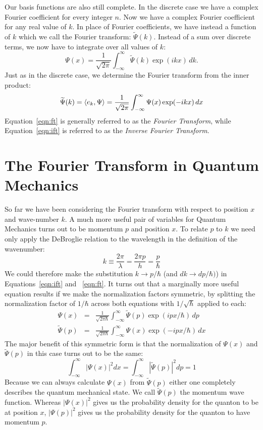 \documentclass[12pt]{book}
\begin{document}
Our basis functions are also still complete.  In the discrete case we have a complex Fourier coefficient for every integer $n$.   Now we have a complex Fourier coefficient for any real value of $k$.  In place of Fourier coefficients, we have instead a function of $k$ which we call the Fourier transform: $\widetilde{\Psi}(k)$.
Instead of a sum over discrete terms, we now have to integrate over all values of $k$:
\begin{equation} \label{eqn:ift}
\Psi(x) = \frac{1}{\sqrt{2\pi}} \int_{-\infty}^{\infty} \widetilde{\Psi}(k) \exp(ikx) \, dk.
\end{equation}
Just as in the discrete case, we determine the Fourier transform from the inner product:
\begin{equation} \label{eqn:ft}
\widetilde{\Psi}(k) = \braket{e_k, \Psi} = \frac{1}{\sqrt{2\pi}} \int_{-\infty}^{\infty} {\Psi}(x) \exp(-ikx) \, dx
\end{equation}
Equation~\ref{eqn:ft} is generally referred to as the {\em Fourier Transform}, while Equation~\ref{eqn:ift} is referred to as the {\em Inverse Fourier Transform}.

\section{The Fourier Transform in Quantum Mechanics}

So far we have been considering the Fourier transform with respect to position $x$ and wave-number $k$.  A much more useful pair of variables for Quantum Mechanics turns out to be momentum $p$ and position $x$.  To relate $p$ to $k$ we need only apply the DeBroglie relation to the wavelength in the definition of the wavenumber:
\begin{displaymath}
k \equiv \frac{2 \pi}{\lambda} = \frac{2 \pi p}{h} = \frac{p}{\hbar}
\end{displaymath}
We could therefore make the substitution $k \to p/\hbar$ (and $dk \to dp / \hbar)$) in Equations~\ref{eqn:ift} and ~\ref{eqn:ft}.  It turns out that a marginally more useful equation results if we make the normalization factors symmetric, by splitting the normalization factor of $1/\hbar$ across both equations with $1/\sqrt{\hbar}$ applied to each:
\begin{eqnarray} 
\Psi(x) &=& \frac{1}{\sqrt{2\pi\hbar}} \int_{-\infty}^{\infty} \widetilde{\Psi}(p) \exp(ipx/\hbar) \, dp \\
\widetilde{\Psi}(p) &=&  \frac{1}{\sqrt{2\pi\hbar}} \int_{-\infty}^{\infty} {\Psi}(x) \exp(-ipx/\hbar) \, dx
\end{eqnarray}
The major benefit of this symmetric form is that the normalization of $\Psi(x)$ and $\widetilde{\Psi}(p)$ in this case turns out to be the same:
\begin{displaymath}
\int_{-\infty}^{\infty} |\Psi(x)|^2 dx = \int_{-\infty}^{\infty} |\widetilde{\Psi}(p)|^2 dp = 1 
\end{displaymath}
Because we can always calculate $\Psi(x)$ from $\widetilde{\Psi}(p)$ either one completely describes the quantum mechanical state.  We call $\widetilde{\Psi}(p)$ the momentum wave function.   Whereas $|\Psi(x)|^2$ gives us the probability density for the quanton to be at position $x$, $|\Psi(p)|^2$ gives us the probability density for the quanton to have momentum $p$.
\end{document}
